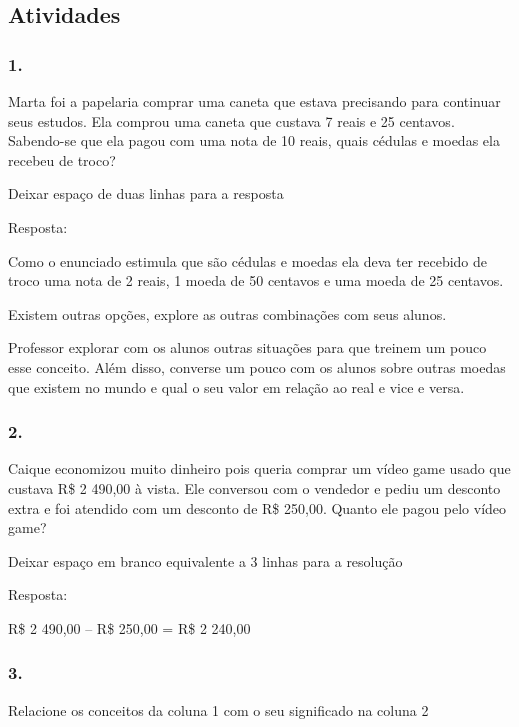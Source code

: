 \subsection{Atividades}\label{atividades-5}

\subsubsection{1.}\label{section-65}

Marta foi a papelaria comprar uma caneta que estava precisando para
continuar seus estudos. Ela comprou uma caneta que custava 7 reais e 25
centavos. Sabendo-se que ela pagou com uma nota de 10 reais, quais
cédulas e moedas ela recebeu de troco?

Deixar espaço de duas linhas para a resposta

Resposta:

Como o enunciado estimula que são cédulas e moedas ela deva ter recebido
de troco uma nota de 2 reais, 1 moeda de 50 centavos e uma moeda de 25
centavos.

Existem outras opções, explore as outras combinações com seus alunos.

Professor explorar com os alunos outras situações para que treinem um
pouco esse conceito. Além disso, converse um pouco com os alunos sobre
outras moedas que existem no mundo e qual o seu valor em relação ao real
e vice e versa.

\subsubsection{2.}\label{section-66}

Caique economizou muito dinheiro pois queria comprar um vídeo game usado
que custava R\$ 2 490,00 à vista. Ele conversou com o vendedor e pediu
um desconto extra e foi atendido com um desconto de R\$ 250,00. Quanto
ele pagou pelo vídeo game?

Deixar espaço em branco equivalente a 3 linhas para a resolução

Resposta:

R\$ 2 490,00 -- R\$ 250,00 = R\$ 2 240,00

\subsubsection{3.}\label{section-67}

Relacione os conceitos da coluna 1 com o seu significado na coluna 2

